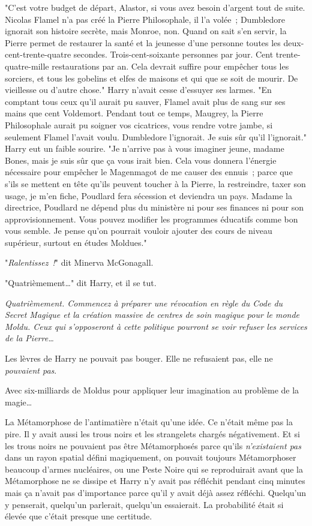 "C'est votre budget de départ, Alastor, si vous avez besoin d'argent tout de suite. Nicolas Flamel n'a pas créé la Pierre Philosophale, il l'a volée~; Dumbledore ignorait son histoire secrète, mais Monroe, non. Quand on sait s'en servir, la Pierre permet de restaurer la santé et la jeunesse d'une personne toutes les deux-cent-trente-quatre secondes. Trois-cent-soixante personnes par jour. Cent trente-quatre-mille restaurations par an. Cela devrait suffire pour empêcher tous les sorciers, et tous les gobelins et elfes de maisons et qui que se soit de mourir. De vieillesse ou d'autre chose." Harry n'avait cesse d'essuyer ses larmes. "En comptant tous ceux qu'il aurait pu sauver, Flamel avait plus de sang sur ses mains que cent Voldemort. Pendant tout ce temps, Maugrey, la Pierre Philosophale aurait pu soigner vos cicatrices, vous rendre votre jambe, si seulement Flamel l'avait voulu. Dumbledore l'ignorait. Je suis sûr qu'il l'ignorait." Harry eut un faible sourire. "Je n'arrive pas à vous imaginer jeune, madame Bones, mais je suis sûr que ça vous irait bien. Cela vous donnera l'énergie nécessaire pour empêcher le Magenmagot de me causer des ennuis~; parce que s'ils se mettent en tête qu'ils peuvent toucher à la Pierre, la restreindre, taxer son usage, je m'en fiche, Poudlard fera sécession et deviendra un pays. Madame la directrice, Poudlard ne dépend plus du ministère ni pour ses finances ni pour son approvisionnement. Vous pouvez modifier les programmes éducatifs comme bon vous semble. Je pense qu'on pourrait vouloir ajouter des cours de niveau supérieur, surtout en études Moldues."

"\emph{Ralentissez~!}" dit Minerva McGonagall.

"Quatrièmement…" dit Harry, et il se tut.

\emph{Quatrièmement. Commencez à préparer une révocation en règle du Code du Secret Magique et la création massive de centres de soin magique pour le monde Moldu. Ceux qui s'opposeront à cette politique pourront se voir refuser les services de la Pierre…}

Les lèvres de Harry ne pouvait pas bouger. Elle ne refusaient pas, elle ne \emph{pouvaient pas}.

Avec six-milliards de Moldus pour appliquer leur imagination au problème de la magie…

La Métamorphose de l'antimatière n'était qu'une idée. Ce n'était même pas la pire. Il y avait aussi les trous noirs et les strangelets chargés négativement. Et si les trous noirs ne pouvaient pas être Métamorphosés parce qu'ils \emph{n'existaient pas} dans un rayon spatial défini magiquement, on pouvait toujours Métamorphoser beaucoup d'armes nucléaires, ou une Peste Noire qui se reproduirait avant que la Métamorphose ne se dissipe et Harry n'y avait pas réfléchit pendant cinq minutes mais ça n'avait pas d'importance parce qu'il y avait déjà assez réfléchi. Quelqu'un y penserait, quelqu'un parlerait, quelqu'un essaierait. La probabilité était si élevée que c'était presque une certitude.

